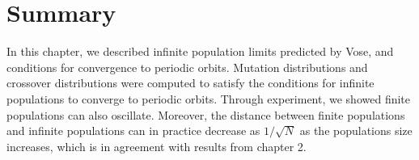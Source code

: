 \section{Summary}
In this chapter, we described infinite population limits predicted by Vose, and conditions 
for convergence to periodic orbits. Mutation distributions and crossover distributions were computed 
to satisfy the conditions for infinite populations to converge to periodic orbits. Through experiment, 
we showed finite populations can also oscillate. 
Moreover, the distance between finite populations and infinite populations can in practice decrease 
as $1/\sqrt{N}$ as the populations size increases, which is in agreement with results from 
chapter 2.





 
